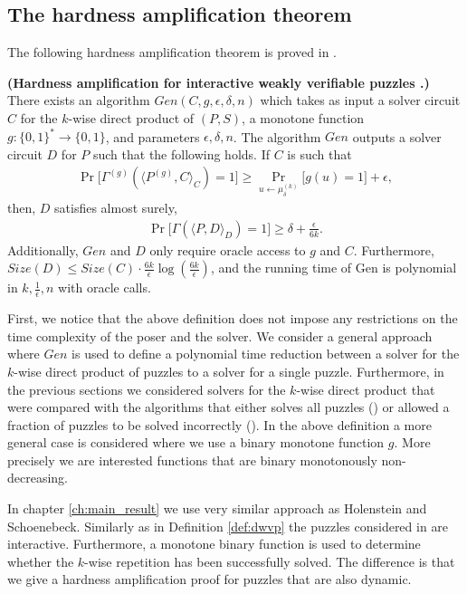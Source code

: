 \subsection{The hardness amplification theorem}
The following hardness amplification theorem is proved in \cite{DBLP:journals/corr/abs-1002-3534}.
\begin{theorem}\textbf{(Hardness amplification for interactive weakly verifiable puzzles \cite{DBLP:journals/corr/abs-1002-3534}.)}
There exists an algorithm $\mathit{Gen}(C,g,\epsilon, \delta, n)$ which takes as input a solver circuit $C$ for the $k$-wise
direct product of $(P,S)$, a monotone function $g: \{0,1\}^{*} \rightarrow \{0,1\}$, and parameters $\epsilon,\delta,n$.
The algorithm $\mathit{Gen}$ outputs a solver circuit $D$ for $P$ such that the following holds.
If $C$ is such that
\begin{align*}
\Pr\Big[\Gamma^{(g)}(\langle P^{(g)}, C \rangle_C) = 1\Big] \geq \Pr_{u \leftarrow \mu_{\delta}^{(k)}} \Big[ g(u) = 1 \Big] + \epsilon,
\end{align*}
then, $D$ satisfies almost surely,
\begin{align*}
  \Pr\Big[ \Gamma(\langle P, D\rangle_{D}) = 1\Big] \geq \delta + \frac{\epsilon}{6k}.
\end{align*}
Additionally, $\mathit{Gen}$ and $D$ only require oracle access to $g$ and $C$.
Furthermore, $\mathit{Size}(D) \leq \mathit{Size}(C) \cdot \frac{6k}{\epsilon} \log(\frac{6k}{\epsilon})$,
and the running time of Gen is polynomial in $k, \frac{1}{\epsilon}, n$ with oracle calls.
\end{theorem}

First, we notice that the above definition does not impose any restrictions on the time complexity of the poser and the solver.
We consider a general approach where $\mathit{Gen}$ is used to define a polynomial time reduction between a solver for the $k$-wise
direct product of puzzles to a solver for a single puzzle.
Furthermore, in the previous sections we considered solvers for the $k$-wise direct product that were compared with the algorithms that either
solves all puzzles (\cite{canetti2004hardness}) or allowed a fraction of puzzles to be solved incorrectly (\cite{Dodis:2009:SAI:1530441.1530450}).
In the above definition a more general case is considered where we use a binary monotone function $g$.
More precisely we are interested functions that are binary monotonously non-decreasing.

In chapter \ref{ch:main_result} we use very similar approach as Holenstein and Schoenebeck.
Similarly as in Definition \ref{def:dwvp} the puzzles considered in \cite{DBLP:journals/corr/abs-1002-3534} are interactive.
Furthermore, a monotone binary function is used to determine whether the $k$-wise repetition
has been successfully solved. The difference is that we give a hardness amplification proof for puzzles that are also dynamic.

